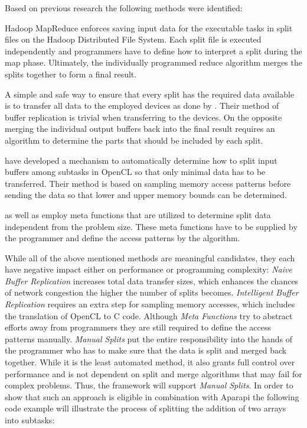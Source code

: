 Based on previous research the following methods were identified:

\begin{description}[style=nextline]
	\item [Manual Splits]
	Hadoop MapReduce enforces saving input data for the executable tasks in split files on the Hadoop Distributed File System. Each split file is executed independently and programmers have to define how to interpret a split during the map phase. Ultimately, the individually programmed reduce algorithm merges the splits together to form a final result.
	
	\item [Naive Buffer Replication]
	A simple and safe way to ensure that every split has the required data available is to transfer all data to the employed devices as done by \citeauthor{delalama_2012}\cite{delalama_2012}. Their method of buffer replication is trivial when transferring to the devices. On the opposite merging the individual output buffers back into the final result requires an algorithm to determine the parts that should be included by each split.
	
	\item [Intelligent Buffer Replication]
	\citeauthor{Kim_2011}\cite{Kim_2011} have developed a mechanism to automatically determine how to split input buffers among subtasks in OpenCL so that only minimal data has to be transferred. Their method is based on sampling memory access patterns before sending the data so that lower and upper memory bounds can be determined.
		
	\item [Meta Functions]
	\citeauthor{stepocl}\cite{stepocl} as well as \citeauthor{distcl}\cite{distcl} employ meta functions that are utilized to determine split data independent from the problem size. These meta functions have to be supplied by the programmer and define the access patterns by the algorithm.
	
\end{description} 

While all of the above mentioned methods are meaningful candidates, they each have negative impact either on performance or programming complexity: \textit{Naive Buffer Replication} increases total data transfer sizes, which enhances the chances of network congestion the higher the number of splits becomes. \textit{Intelligent Buffer Replication} requires an extra step for sampling memory accesses, which includes the translation of OpenCL to C code. Although \textit{Meta Functions} try to abstract efforts away from programmers they are still required to define the access patterns manually. \textit{Manual Splits} put the entire responsibility into the hands of the programmer who has to make sure that the data is split and merged back together. While it is the least automated method, it also grants full control over performance and is not dependent on split and merge algorithms that may fail for complex problems. Thus, the framework will support \textit{Manual Splits}. In order to show that such an approach is eligible in combination with Aparapi the following code example will illustrate the process of splitting the addition of two arrays into subtasks:

